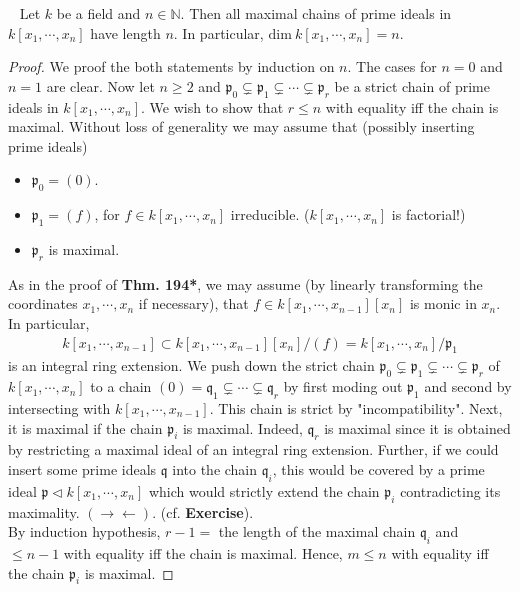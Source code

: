 \documentclass[12pt,a4paper,footinclude=true,headinclude=true]{scrbook} %
\newenvironment{proposition}[2][]
{\renewcommand\theinnercustomprop{#2}\innercustomprop[#1] 
\begin{mdframed}[backgroundcolor=gray!20]\ }
{\end{mdframed}\endinnercustomprop}
\begin{document}
\begin{proposition}{197}
    Let $k$ be a field and $n\in\mathbb{N}$. Then all maximal chains of prime ideals in $k[x_1,\cdots,x_n]$ have length $n$. In particular, $\mathrm{dim}\ k[x_1,\cdots,x_n]=n$.
\end{proposition}
\begin{proof}
    We proof the both statements by induction on $n$. The cases for $n=0$ and $n=1$ are clear. Now let $n\geq2$ and $\mathfrak{p}_0\subsetneq\mathfrak{p}_1\subsetneq\cdots\subsetneq\mathfrak{p}_r$ be a strict chain of prime ideals in $k[x_1,\cdots,x_n]$. We wish to show that $r\leq n$ with equality iff the chain is maximal. Without loss of generality we may assume that (possibly inserting prime ideals)
    \begin{itemize}
        \item $\mathfrak{p}_0=(0)$.
        \item $\mathfrak{p}_1=(f)$, for $f\in k[x_1,\cdots,x_n]$ irreducible. ($k[x_1,\cdots,x_n]$ is factorial!)
        \item $\mathfrak{p}_r$ is maximal.
    \end{itemize}
    As in the proof of \textbf{Thm. 194*}, we may assume (by linearly transforming the coordinates $x_1,\cdots,x_n$ if necessary), that $f\in k[x_1,\cdots,x_{n-1}][x_n]$ is monic in $x_n$. In particular,
    \begin{align*}
        k[x_1,\cdots,x_{n-1}]\subset k[x_1,\cdots,x_{n-1}][x_n]/(f)
        =k[x_1,\cdots,x_n]/\mathfrak{p}_1
    \end{align*}
    is an integral ring extension. We push down the strict chain $\mathfrak{p}_0\subsetneq\mathfrak{p}_1\subsetneq\cdots\subsetneq\mathfrak{p}_r$ of $k[x_1,\cdots,x_n]$ to a chain $(0)= \mathfrak{q}_1\subsetneq\cdots\subsetneq\mathfrak{q}_r$ by first moding out $\mathfrak{p}_1$ and second by intersecting with $k[x_1,\cdots,x_{n-1}]$. This chain is strict by "incompatibility". Next, it is maximal if the chain $\mathfrak{p}_i$ is maximal. Indeed, $\mathfrak{q}_r$ is maximal since it is obtained by restricting a maximal ideal of an integral ring extension. Further, if we could insert some prime ideals $\mathfrak{q}$ into the chain $\mathfrak{q}_i$, this would be covered by a prime ideal $\mathfrak{p}\triangleleft k[x_1,\cdots,x_n]$ which would strictly extend the chain $\mathfrak{p}_i$ contradicting its maximality. $(\to\gets)$. (cf. \textbf{Exercise}).\\
    By induction hypothesis, $r-1=$ the length of the maximal chain $\mathfrak{q}_i$ and $\leq n-1$ with equality iff the chain is maximal. Hence, $m\leq n$ with equality iff the chain $\mathfrak{p}_i$ is maximal.
\end{proof}
\end{document}
